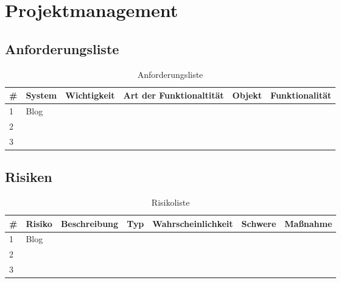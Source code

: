 \newpage
\section{ Projektmanagement }
\subsection{ Anforderungsliste}

\begin{table}[]
    \begin{tabular}{|l|l|l|l|l|l|}
    \hline
    \# & \textbf{System} & \textbf{Wichtigkeit} & \textbf{Art der Funktionaltität} & \textbf{Objekt} & \textbf{Funktionalität} \\ \hline
    1  &  Blog           &                      &                                  &                 &                         \\ \hline
    2  &                 &                      &                                  &                 &                         \\ \hline
    3  &                 &                      &                                  &                 &                         \\ \hline
    \end{tabular}
    \caption{Anforderungsliste}
    \label{tab:Anforderungsliste}
\end{table}

\subsection{ Risiken }
\begin{table}[]
    \begin{tabular}{|l|l|l|l|l|l|l|}
    \hline
    \# & \textbf{Risiko} & \textbf{Beschreibung} & \textbf{Typ} & \textbf{Wahrscheinlichkeit} & \textbf{Schwere} & \textbf{Maßnahme}\\ \hline
    1  &  Blog           &                      &                                  &                 &           &              \\ \hline
    2  &                 &                      &                                  &                 &            &             \\ \hline
    3  &                 &                      &                                  &                 &             &            \\ \hline
    \end{tabular}
    \caption{Risikoliste}
    \label{tab:Risikoliste}
\end{table}

